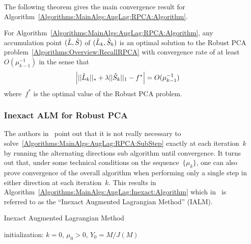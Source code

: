 \documentclass{../../common/projectreport}
\begin{document}
The following theorem gives the main convergence result for Algorithm~\ref{Algorithms:MainAlgs:AugLag:RPCA:Algorithm}.\\

\begin{theorem}
For Algorithm~\ref{Algorithms:MainAlgs:AugLag:RPCA:Algorithm}, any accumulation point $({\hat{L}},{\hat{S}})$ of $({\hat{L}}_k,{\hat{S}}_k)$ is an optimal solution to the Robust PCA problem~\eqref{Algorithms:Overview:RecallRPCA} with convergence rate of at least~$O(\mu_{k-1}^{-1})$ in the sense that
\begin{align*}
\left| ||{\hat{L}}_k||_* + \lambda ||{\hat{S}}_k||_1 - f^* \right| = O(\mu_{k-1}^{-1})
\end{align*}
where~$f^*$ is the optimal value of the Robust PCA problem.
\end{theorem}



\subsubsection{Inexact ALM for Robust PCA}
\label{Algorithms:MainAlgs:AugLag:Inexact:Subsubsec}

The authors in~\cite{Lin:2010fk} point out that it is not really necessary to solve~\eqref{Algorithms:MainAlgs:AugLag:RPCA:SubStep} exactly at each iteration~$k$ by running the alternating directions sub algorithm until convergence. It turns out that, under some technical conditions on the sequence~$\{\mu_k\}$, one can also prove convergence of the overall algorithm when performing only a single step in either direction at each iteration~$k$.  This results in Algorithm~\ref{Algorithms:MainAlgs:AugLag:Inexact:Algorithm} which in~\cite{Lin:2010fk} is referred to as the ``Inexact Augmented Lagrangian Method'' (IALM).

\begin{algorithm}
\caption{Inexact Augmented Lagrangian Method}
initialization: $k=0$, $\mu_0>0$, $Y_0 = M/J(M)$\;
\label{Algorithms:MainAlgs:AugLag:Inexact:Algorithm}
\end{algorithm}
\end{document}
